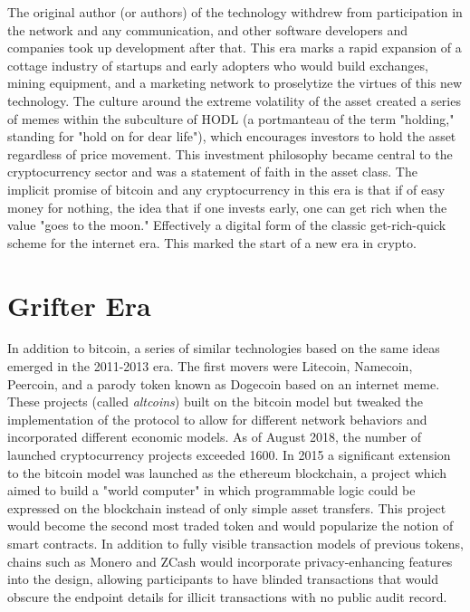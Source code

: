 The original author (or authors) of the technology withdrew from participation
in the network and any communication, and other software developers and
companies took up development after that. This era marks a rapid expansion of a
cottage industry of startups and early adopters who would build exchanges,
mining equipment, and a marketing network to proselytize the virtues of this new
technology. The culture around the extreme volatility of the asset created a
series of memes within the subculture of HODL (a portmanteau of the term
"holding," standing for "hold on for dear life"), which encourages investors to
hold the asset regardless of price movement. This investment philosophy became
central to the cryptocurrency sector and was a statement of faith in the asset
class. The implicit promise of bitcoin and any cryptocurrency in this era is
that if of easy money for nothing, the idea that if one invests early, one can
get rich when the value "goes to the moon." Effectively a digital form of the
classic get-rich-quick scheme for the internet era. This marked the start of a
new era in crypto.

\section{Grifter Era}


In addition to bitcoin, a series of similar technologies based on the same ideas
emerged in the 2011-2013 era. The first movers were Litecoin, Namecoin,
Peercoin, and a parody token known as Dogecoin based on an internet meme. These
projects (called \textit{altcoins}) built on the bitcoin model but tweaked the
implementation of the protocol to allow for different network behaviors and
incorporated different economic models. As of August 2018, the number of
launched cryptocurrency projects exceeded 1600. In 2015 a significant extension
to the bitcoin model was launched as the ethereum blockchain, a project which
aimed to build a "world computer" in which programmable logic could be expressed
on the blockchain instead of only simple asset transfers. This project would
become the second most traded token and would popularize the notion of smart
contracts. In addition to fully visible transaction models of previous tokens,
chains such as Monero and ZCash would incorporate privacy-enhancing features
into the design, allowing participants to have blinded transactions that would
obscure the endpoint details for illicit transactions with no public audit
record.


